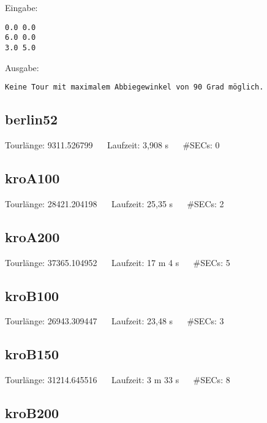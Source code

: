 \documentclass[a4paper, 10pt, ngerman]{article}
\begin{document}
\noindent Eingabe:
\begin{verbatim}
0.0 0.0
6.0 0.0
3.0 5.0
\end{verbatim}

\noindent Ausgabe:
\begin{verbatim}
Keine Tour mit maximalem Abbiegewinkel von 90 Grad möglich.
\end{verbatim}

\subsection{berlin52}



\noindent Tourlänge: 9311.526799 $\quad$ Laufzeit: 3,908 s $\quad$ \#SECs: 0

\subsection{kroA100}



\noindent Tourlänge: 28421.204198 $\quad$ Laufzeit: 25,35 s $\quad$ \#SECs: 2 

\subsection{kroA200}



\noindent Tourlänge: 37365.104952 $\quad$ Laufzeit: 17 m 4 s $\quad$ \#SECs: 5 

\subsection{kroB100}



\noindent Tourlänge: 26943.309447 $\quad$ Laufzeit: 23,48 s $\quad$ \#SECs: 3 

\subsection{kroB150}



\noindent Tourlänge: 31214.645516 $\quad$ Laufzeit: 3 m 33 s $\quad$ \#SECs: 8

\subsection{kroB200}
\end{document}
